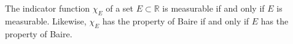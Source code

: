 The indicator function $\chi_E$ of a set $E \subset \mathbb{R}$ is measurable if and only if $E$ is measurable. Likewise, $\chi_E$ has the property of Baire if and only if $E$ has the property of Baire.
